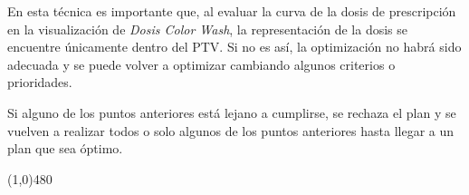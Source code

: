 \documentclass{article}
\begin{document}
En esta técnica es importante que, al evaluar la curva de la dosis de prescripción en la visualización de \textit{Dosis Color Wash}, la representación de la dosis se encuentre únicamente dentro del PTV. Si no es así, la optimización no habrá sido adecuada y se puede volver a optimizar cambiando algunos criterios o prioridades.

Si alguno de los puntos anteriores está lejano a cumplirse, se rechaza el plan y se vuelven a realizar todos o solo algunos de los puntos anteriores hasta llegar a un plan que sea óptimo.
    
\vspace{4.8cm}


\begin{center}
\line(1,0){480}
\end{center}
\end{document}
